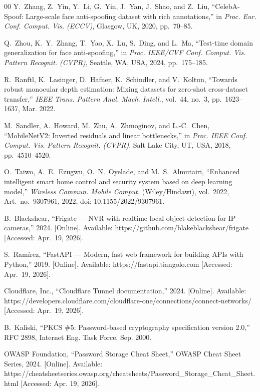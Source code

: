 \documentclass{ieeeaccess}
\begin{document}
\begin{thebibliography}{00}
 Y.~Zhang, Z.~Yin, Y.~Li, G.~Yin, J.~Yan, J.~Shao, and Z.~Liu, ``CelebA-Spoof: Large-scale face anti-spoofing dataset with rich annotations,'' in \emph{Proc. Eur. Conf. Comput. Vis. (ECCV)}, Glasgow, UK, 2020, pp.~70--85.

 Q.~Zhou, K.~Y.~Zhang, T.~Yao, X.~Lu, S.~Ding, and L.~Ma, ``Test-time domain generalization for face anti-spoofing,'' in \emph{Proc. IEEE/CVF Conf. Comput. Vis. Pattern Recognit. (CVPR)}, Seattle, WA, USA, 2024, pp.~175--185.

 R.~Ranftl, K.~Lasinger, D.~Hafner, K.~Schindler, and V.~Koltun, ``Towards robust monocular depth estimation: Mixing datasets for zero-shot cross-dataset transfer,'' \emph{IEEE Trans. Pattern Anal. Mach. Intell.}, vol.~44, no.~3, pp.~1623--1637, Mar. 2022.

 M.~Sandler, A.~Howard, M.~Zhu, A.~Zhmoginov, and L.-C.~Chen, ``MobileNetV2: Inverted residuals and linear bottlenecks,'' in \emph{Proc. IEEE Conf. Comput. Vis. Pattern Recognit. (CVPR)}, Salt Lake City, UT, USA, 2018, pp.~4510--4520.

 O.~Taiwo, A.~E.~Ezugwu, O.~N.~Oyelade, and M.~S.~Almutairi, ``Enhanced intelligent smart home control and security system based on deep learning model,'' \emph{Wireless Commun. Mobile Comput.} (Wiley/Hindawi), vol.~2022, Art.~no.~9307961, 2022, doi: 10.1155/2022/9307961.

 B.~Blackshear, ``Frigate --- NVR with realtime local object detection for IP cameras,'' 2024. [Online]. Available: https://github.com/blakeblackshear/frigate [Accessed: Apr.~19, 2026].

 S.~Ram\'{i}rez, ``FastAPI --- Modern, fast web framework for building APIs with Python,'' 2019. [Online]. Available: https://fastapi.tiangolo.com [Accessed: Apr.~19, 2026].

 Cloudflare, Inc., ``Cloudflare Tunnel documentation,'' 2024. [Online]. Available: https://developers.cloudflare.com/cloudflare-one/connections/connect-networks/ [Accessed: Apr.~19, 2026].

 B.~Kaliski, ``PKCS \#5: Password-based cryptography specification version 2.0,'' RFC 2898, Internet Eng. Task Force, Sep. 2000.

 OWASP Foundation, ``Password Storage Cheat Sheet,'' OWASP Cheat Sheet Series, 2024. [Online]. Available: https://cheatsheetseries.owasp.org/cheatsheets/Password\_Storage\_Cheat\_Sheet.html [Accessed: Apr. 19, 2026].


\end{thebibliography}
\end{document}
